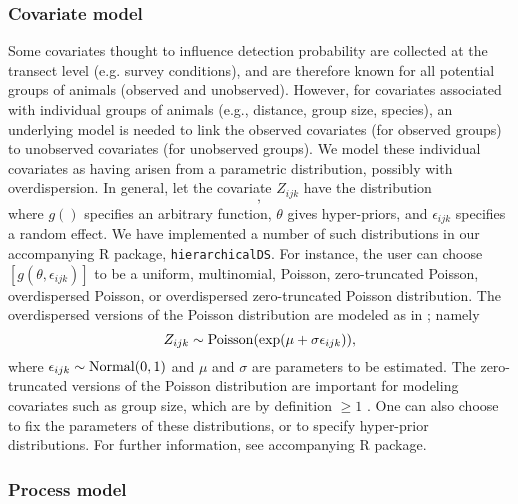 \documentclass[10pt]{article}
\begin{document}
\subsubsection*{Covariate model}

Some covariates thought to influence detection probability are collected at the transect level (e.g. survey conditions), and are therefore known for all potential groups of animals (observed and unobserved).  However, for covariates associated with individual groups of animals (e.g., distance, group size, species), an underlying model is needed to link the observed covariates (for observed groups) to unobserved covariates (for unobserved groups).  We model these individual covariates as having arisen from a parametric distribution, possibly with overdispersion.  In general, let the covariate $Z_{ijk}$ have the distribution
\begin{equation}
[g(\theta,\epsilon_{ijk})],
\label{eq:cov.dist}
\end{equation}
where $g()$ specifies an arbitrary function, $\theta$ gives hyper-priors, and $\epsilon_{ijk}$ specifies a random effect.  We have implemented a number of such distributions in our accompanying R package, {\tt hierarchicalDS}.  For instance, the user can choose $[g(\theta,\epsilon_{ijk})]$ to be a uniform, multinomial, Poisson, zero-truncated Poisson, overdispersed Poisson, or overdispersed zero-truncated Poisson distribution.  The overdispersed versions of the Poisson distribution are modeled as in \cite{McClintockEtAl2009}; namely
$$
Z_{ijk} \sim {\rm Poisson}(\exp(\mu+\sigma \epsilon_{ijk})),
$$
where $\epsilon_{ijk} \sim {\rm Normal}(0,1)$ and $\mu$ and $\sigma$ are parameters to be estimated.
The zero-truncated versions of the Poisson distribution are important for modeling covariates such as group size, which are by definition $\ge 1$ \cite{Royle2008}.
One can also choose to fix the parameters of these distributions, or to specify hyper-prior distributions.  For further information, see accompanying R package.

\subsubsection*{Process model}
\end{document}
